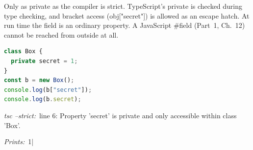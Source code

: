 \documentclass[10pt]{article}
\newcommand{\code}[1]{{\ttfamily\small #1}}
\begin{document}
Only as private as the compiler is strict. TypeScript's \code{private} is checked during type checking, and bracket access (\code{obj["secret"]}) is allowed as an escape hatch. At run time the field is an ordinary property. A JavaScript \code{\#field} (Part~1, Ch.~12) cannot be reached from outside at all.
\begin{lstlisting}[language=TypeScript]
class Box {
  private secret = 1;
}
const b = new Box();
console.log(b["secret"]);
console.log(b.secret);
\end{lstlisting}
{\small\textit{tsc --strict:}~line 6: Property 'secret' is private and only accessible within class 'Box'.}\par
{\small\textit{Prints:}~\code{1}\enspace\textcolor{black!45}{|}\enspace \code{1}}\par
\end{document}
